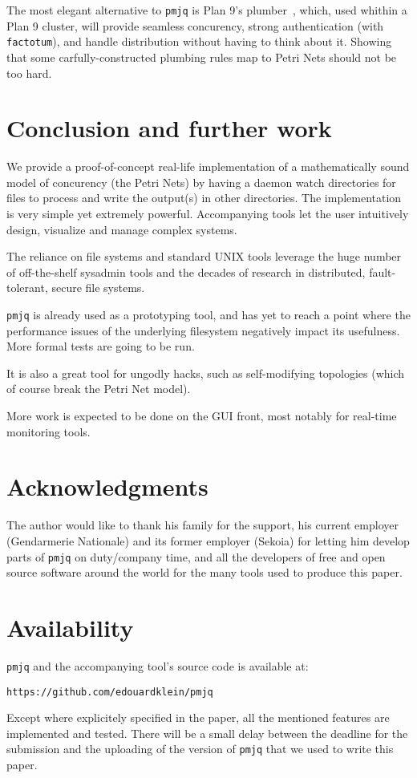 \documentclass[letterpaper,twocolumn,10pt]{article}
\begin{document}
The most elegant alternative to {\tt pmjq} is Plan 9's plumber~\cite{plumber}, which, used whithin a Plan 9 cluster, will provide seamless concurency, strong authentication (with {\tt factotum}), and handle distribution without having to think about it. Showing that some carfully-constructed plumbing rules map to Petri Nets should not be too hard.

\section{Conclusion and further work}
We provide a proof-of-concept real-life implementation of a mathematically sound model of concurency (the Petri Nets) by having a daemon watch directories for files to process and write the output(s) in other directories. The implementation is very simple yet extremely powerful. Accompanying tools let the user intuitively design, visualize and manage complex systems.

The reliance on file systems and standard UNIX tools leverage the huge number of off-the-shelf sysadmin tools and the decades of research in distributed, fault-tolerant, secure file systems.

{\tt pmjq} is already used as a prototyping tool, and has yet to reach a point where the performance issues of the underlying filesystem negatively impact its usefulness. More formal tests are going to be run.

It is also a great tool for ungodly hacks, such as self-modifying topologies (which of course break the Petri Net model).

More work is expected to be done on the GUI front, most notably for real-time monitoring tools.

\section{Acknowledgments}

The author would like to thank his family for the support, his current employer (Gendarmerie Nationale) and its former employer (Sekoia) for letting him develop parts of {\tt pmjq} on duty/company time, and all the developers of free and open source software around the world for the many tools used to produce this paper.


\section{Availability}

{\tt pmjq} and the accompanying tool's source code is available at:

\begin{center}
{\tt https://github.com/edouardklein/pmjq }\\
\end{center}

Except where explicitely specified in the paper, all the mentioned features are implemented and tested. There will be a small delay between the deadline for the submission and the uploading of the version of {\tt pmjq} that we used to write this paper.

{\footnotesize 
}


\theendnotes
\end{document}
